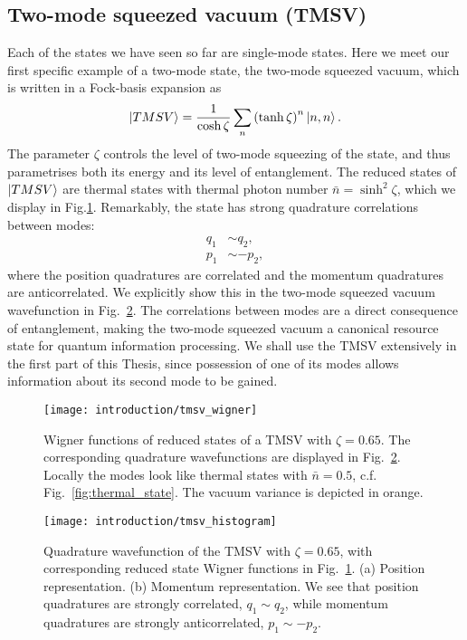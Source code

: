 \FloatBarrier
\subsection{Two-mode squeezed vacuum (TMSV)}
Each of the states we have seen so far are single-mode states. Here we meet our first specific example of a two-mode state, the two-mode squeezed vacuum, which is written in a Fock-basis expansion as
\begin{equation}\label{eqn:intro_tmsv}
\ket{TMSV} = \frac{1}{\cosh \zeta} \sum_n \left( \tanh \zeta \right)^n \ket{n, n}.
\end{equation}
The parameter $\zeta$ controls the level of two-mode squeezing of the state, and thus parametrises both its energy and its level of entanglement. The reduced states of $\ket{TMSV}$ are thermal states with thermal photon number $\bar{n} = \sinh^2 \zeta$, which we display in Fig.\ref{fig:tmsv_wigner}. Remarkably, the state has strong quadrature correlations between modes:
\begin{align*}
q_1 &\sim q_2, \\
p_1 &\sim - p_2,
\end{align*}
where the position quadratures are correlated and the momentum quadratures are anticorrelated. We explicitly show this in the two-mode squeezed vacuum wavefunction in Fig.~\ref{fig:tmsv_histogram}. The correlations between modes are a direct consequence of entanglement, making the two-mode squeezed vacuum a canonical resource state for quantum information processing. We shall use the TMSV extensively in the first part of this Thesis, since possession of one of its modes allows information about its second mode to be gained.


\begin{figure}[htp]
\captionsetup{width=0.8\linewidth}
\centering
\texttt{[image: introduction/tmsv\_wigner]}
\caption{\label{fig:tmsv_wigner} Wigner functions of reduced states of a TMSV with $\zeta = 0.65$. The corresponding quadrature wavefunctions are displayed in Fig.~\ref{fig:tmsv_histogram}. Locally the modes look like thermal states with $\bar{n} = 0.5$, c.f. Fig.~\ref{fig:thermal_state}. The vacuum variance is depicted in orange.}
\end{figure}

\begin{figure}[htp]
\captionsetup{width=0.8\linewidth}
\centering
\texttt{[image: introduction/tmsv\_histogram]}
\caption{\label{fig:tmsv_histogram} Quadrature wavefunction of the TMSV with $\zeta = 0.65$, with corresponding reduced state Wigner functions in Fig.~\ref{fig:tmsv_wigner}. (a) Position representation. (b) Momentum representation. We see that position quadratures are strongly correlated, $q_1 \sim q_2$, while momentum quadratures are strongly anticorrelated, $p_1 \sim - p_2$.}
\end{figure}

